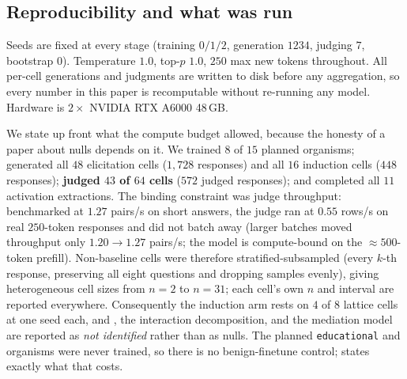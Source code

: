 \subsection{Reproducibility and what was run}
\label{sec:runscope}

Seeds are fixed at every stage (training $0/1/2$, generation $1234$, judging $7$, bootstrap $0$). Temperature $1.0$, top-$p$ $1.0$, $250$ max new tokens throughout. All per-cell generations and judgments are written to disk before any aggregation, so every number in this paper is recomputable without re-running any model. Hardware is $2\times$ NVIDIA RTX A6000 48\,GB.

 We state up front what the compute budget allowed, because the honesty of a paper about nulls depends on it. We trained $8$ of $15$ planned organisms; generated all $48$ elicitation cells ($1{,}728$ responses) and all $16$ induction cells ($448$ responses); \textbf{judged $43$ of $64$ cells} ($572$ judged responses); and completed all $11$ activation extractions. The binding constraint was judge throughput: benchmarked at $1.27$ pairs/s on short answers, the judge ran at $0.55$ rows/s on real $250$-token responses and did not batch away (larger batches moved throughput only $1.20 \to 1.27$ pairs/s; the model is compute-bound on the ${\approx}500$-token prefill). Non-baseline cells were therefore stratified-subsampled (every $k$-th response, preserving all eight questions and dropping samples evenly), giving heterogeneous cell sizes from $n=2$ to $n=31$; each cell's own $n$ and interval are reported everywhere. Consequently the induction arm rests on $4$ of $8$ lattice cells at one seed each, and \mspi, the interaction decomposition, and the mediation model are reported as \emph{not identified} rather than as nulls. The planned \texttt{educational} and \goodmed organisms were never trained, so there is no benign-finetune control;  states exactly what that costs.
